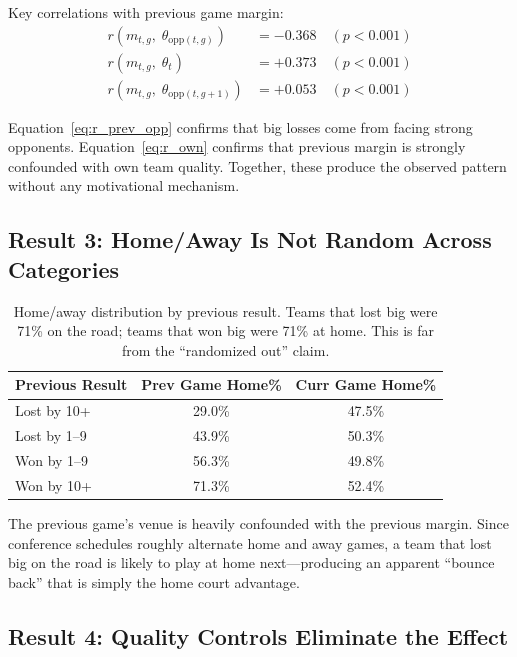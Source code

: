 \documentclass[11pt]{article}
\begin{document}
\noindent Key correlations with previous game margin:
\begin{align}
r(m_{t,g},\; \theta_{\text{opp}(t,g)}) &= -0.368 \quad (p < 0.001) \label{eq:r_prev_opp} \\
r(m_{t,g},\; \theta_t) &= +0.373 \quad (p < 0.001) \label{eq:r_own} \\
r(m_{t,g},\; \theta_{\text{opp}(t,g+1)}) &= +0.053 \quad (p < 0.001) \label{eq:r_next_opp}
\end{align}

\noindent Equation~\eqref{eq:r_prev_opp} confirms that big losses come from facing strong opponents. Equation~\eqref{eq:r_own} confirms that previous margin is strongly confounded with own team quality. Together, these produce the observed pattern without any motivational mechanism.

\subsection{Result 3: Home/Away Is Not Random Across Categories}

\begin{table}[h]
\centering
\begin{tabular}{lcc}
\toprule
Previous Result & Prev Game Home\% & Curr Game Home\% \\
\midrule
Lost by 10+ & 29.0\% & 47.5\% \\
Lost by 1--9 & 43.9\% & 50.3\% \\
Won by 1--9 & 56.3\% & 49.8\% \\
Won by 10+ & 71.3\% & 52.4\% \\
\bottomrule
\end{tabular}
\caption{Home/away distribution by previous result. Teams that lost big were 71\% on the road; teams that won big were 71\% at home. This is far from the ``randomized out'' claim.}
\label{tab:home_away}
\end{table}

\noindent The previous game's venue is heavily confounded with the previous margin. Since conference schedules roughly alternate home and away games, a team that lost big on the road is likely to play at home next---producing an apparent ``bounce back'' that is simply the home court advantage.

\subsection{Result 4: Quality Controls Eliminate the Effect}
\end{document}
